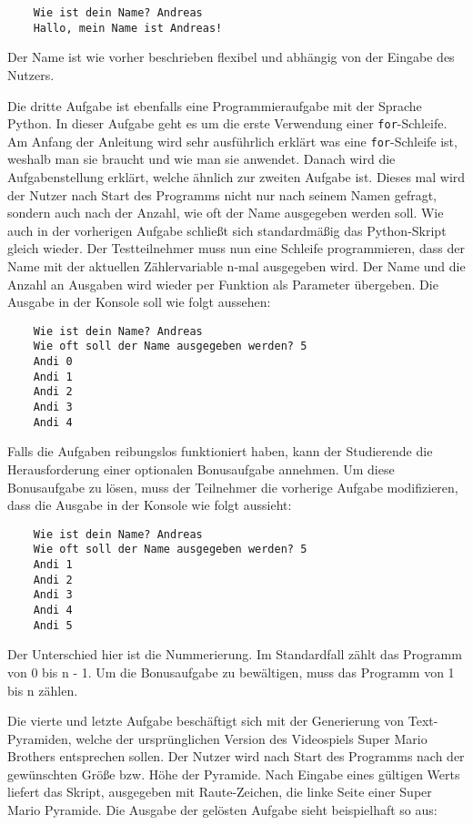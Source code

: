 \begin{lstlisting}
    Wie ist dein Name? Andreas
    Hallo, mein Name ist Andreas!
\end{lstlisting}

Der Name ist wie vorher beschrieben flexibel und abhängig von der Eingabe des
Nutzers.

Die dritte Aufgabe ist ebenfalls eine Programmieraufgabe mit der
Sprache Python. In dieser Aufgabe geht es um die erste Verwendung einer
\texttt{for}-Schleife. Am Anfang der Anleitung wird sehr ausführlich erklärt was
eine \texttt{for}-Schleife ist, weshalb man sie braucht und wie man sie
anwendet. Danach wird die Aufgabenstellung erklärt, welche ähnlich zur zweiten
Aufgabe ist. Dieses mal wird der Nutzer nach Start des Programms nicht nur nach
seinem Namen gefragt, sondern auch nach der Anzahl, wie oft der Name ausgegeben
werden soll. Wie auch in der vorherigen Aufgabe schließt sich standardmäßig das
Python-Skript gleich wieder. Der Testteilnehmer muss nun eine Schleife
programmieren, dass der Name mit der aktuellen Zählervariable n-mal ausgegeben
wird. Der Name und die Anzahl an Ausgaben wird wieder per Funktion als Parameter
übergeben. Die Ausgabe in der Konsole soll wie folgt aussehen:

\begin{lstlisting}
    Wie ist dein Name? Andreas
    Wie oft soll der Name ausgegeben werden? 5
    Andi 0
    Andi 1
    Andi 2
    Andi 3
    Andi 4
\end{lstlisting}

Falls die Aufgaben reibungslos funktioniert haben, kann der Studierende
die Herausforderung einer optionalen Bonusaufgabe annehmen. Um diese
Bonusaufgabe zu lösen, muss der Teilnehmer die vorherige Aufgabe modifizieren,
dass die Ausgabe in der Konsole wie folgt aussieht:

\begin{lstlisting}
    Wie ist dein Name? Andreas
    Wie oft soll der Name ausgegeben werden? 5
    Andi 1
    Andi 2
    Andi 3
    Andi 4
    Andi 5
\end{lstlisting}

Der Unterschied hier ist die Nummerierung. Im Standardfall zählt das Programm
von 0 bis n - 1. Um die Bonusaufgabe zu bewältigen, muss das Programm von 1 bis n
zählen.

Die vierte und letzte Aufgabe beschäftigt sich mit der Generierung von
Text-Pyramiden, welche der ursprünglichen Version des Videospiels Super Mario
Brothers entsprechen sollen. Der Nutzer wird nach Start des Programms nach der gewünschten Größe bzw. Höhe der Pyramide. Nach Eingabe eines gültigen Werts
liefert das Skript, ausgegeben mit Raute-Zeichen, die linke Seite einer Super
Mario Pyramide. Die Ausgabe der gelösten Aufgabe sieht beispielhaft so aus:

